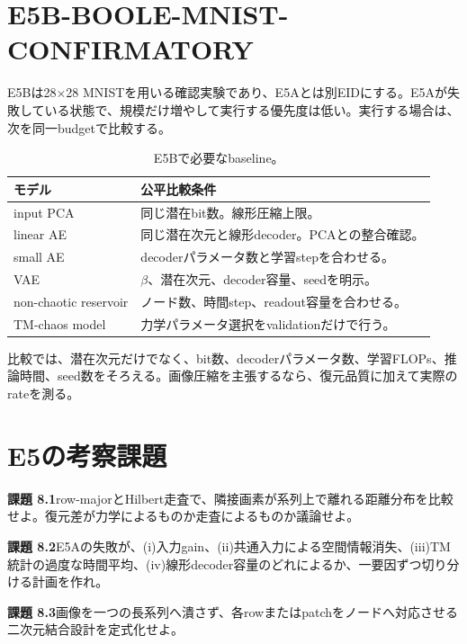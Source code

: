 \documentclass[a4paper,11pt,oneside,openany]{ltjsbook}
\begin{document}
\section{E5B-BOOLE-MNIST-CONFIRMATORY}

E5Bは28\(\times\)28 MNISTを用いる確認実験であり、E5Aとは別EIDにする。E5Aが失敗している状態で、規模だけ増やして実行する優先度は低い。実行する場合は、次を同一budgetで比較する。

\begin{table}[htbp]
\centering
\caption{E5Bで必要なbaseline。}
\label{tab:e5b_baselines}
\begin{tabularx}{\textwidth}{p{36mm}X}
\toprule
モデル & 公平比較条件 \\
\midrule
input PCA & 同じ潜在bit数。線形圧縮上限。\\
linear AE & 同じ潜在次元と線形decoder。PCAとの整合確認。\\
small AE & decoderパラメータ数と学習stepを合わせる。\\
VAE & \(\beta\)、潜在次元、decoder容量、seedを明示。\\
non-chaotic reservoir & ノード数、時間step、readout容量を合わせる。\\
TM-chaos model & 力学パラメータ選択をvalidationだけで行う。\\
\bottomrule
\end{tabularx}
\end{table}

比較では、潜在次元だけでなく、bit数、decoderパラメータ数、学習FLOPs、推論時間、seed数をそろえる。画像圧縮を主張するなら、復元品質に加えて実際のrateを測る。

\section{E5の考察課題}

\begin{taskbox}
\textbf{課題 8.1}\quad row-majorとHilbert走査で、隣接画素が系列上で離れる距離分布を比較せよ。復元差が力学によるものか走査によるものか議論せよ。

\medskip
\textbf{課題 8.2}\quad E5Aの失敗が、(i)入力gain、(ii)共通入力による空間情報消失、(iii)TM統計の過度な時間平均、(iv)線形decoder容量のどれによるか、一要因ずつ切り分ける計画を作れ。

\medskip
\textbf{課題 8.3}\quad 画像を一つの長系列へ潰さず、各rowまたはpatchをノードへ対応させる二次元結合設計を定式化せよ。
\end{taskbox}
\end{document}
